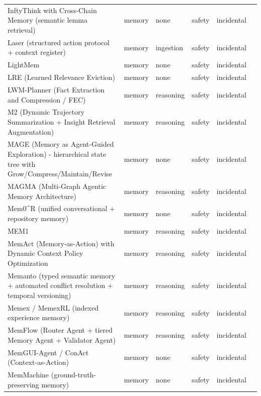 \begin{longtable}{@{}p{}lllll@{}}
InftyThink with Cross-Chain Memory (semantic lemma retrieval) & memory & none & safety & incidental & \cite{tekin-2025-directional} \\
Laser (structured action protocol + context register) & memory & ingestion & safety & incidental & \cite{wang-2025-laser} \\
LightMem & memory & none & safety & incidental & \cite{zhang-2026-lightweight} \\
LRE (Learned Relevance Eviction) & memory & none & safety & incidental & \cite{lia-2026-learning} \\
LWM-Planner (Fact Extraction and Compression / FEC) & memory & reasoning & safety & incidental & \cite{holt-2025-factaugmented} \\
M2 (Dynamic Trajectory Summarization + Insight Retrieval Augmentation) & memory & reasoning & safety & incidental & \cite{yan-2026-dualmemory} \\
MAGE (Memory as Agent-Guided Exploration) - hierarchical state tree with Grow/Compress/Maintain/Revise & memory & none & safety & incidental & \cite{chen-2026-semantic} \\
MAGMA (Multi-Graph Agentic Memory Architecture) & memory & reasoning & safety & incidental & \cite{jiang-2026-magma} \\
Mem0\^{}R (unified conversational + repository memory) & memory & none & safety & incidental & \cite{liu-2026-scalable} \\
MEM1 & memory & reasoning & safety & incidental & \cite{zhou-2025-mem1} \\
MemAct (Memory-as-Action) with Dynamic Context Policy Optimization & memory & reasoning & safety & incidental & \cite{zhang-2025-memory} \\
Memanto (typed semantic memory + automated conflict resolution + temporal versioning) & memory & reasoning & safety & incidental & \cite{abtahi-2026-memanto} \\
Memex / MemexRL (indexed experience memory) & memory & reasoning & safety & incidental & \cite{wang-2026-memex} \\
MemFlow (Router Agent + tiered Memory Agent + Validator Agent) & memory & reasoning & safety & incidental & \cite{chen-2026-memflow} \\
MemGUI-Agent / ConAct (Context-as-Action) & memory & none & safety & incidental & \cite{liu-2026-memguiagent} \\
MemMachine (ground-truth-preserving memory) & memory & none & safety & incidental & \cite{wang-2026-memmachine} \\

\end{longtable}
